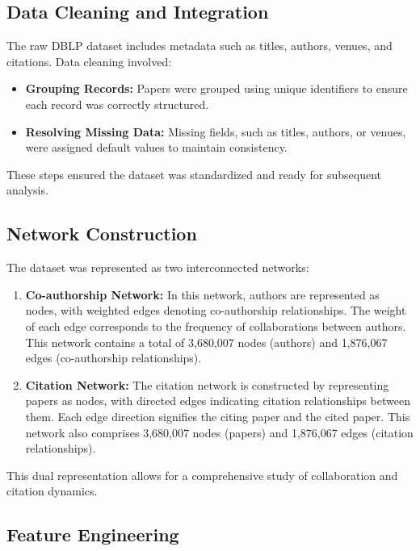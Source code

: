 \documentclass[11pt]{article}
\begin{document}
\subsection{Data Cleaning and Integration}

The raw DBLP dataset includes metadata such as titles, authors, venues, and citations. Data cleaning involved:
\begin{itemize}
	\item \textbf{Grouping Records:} Papers were grouped using unique identifiers to ensure each record was correctly structured.
	\item \textbf{Resolving Missing Data:} Missing fields, such as titles, authors, or venues, were assigned default values to maintain consistency.
\end{itemize}

These steps ensured the dataset was standardized and ready for subsequent analysis.

\subsection{Network Construction}

The dataset was represented as two interconnected networks:

\begin{enumerate}
	\item \textbf{Co-authorship Network:} In this network, authors are represented as nodes, with weighted edges denoting co-authorship relationships. The weight of each edge corresponds to the frequency of collaborations between authors. This network contains a total of 3,680,007 nodes (authors) and 1,876,067 edges (co-authorship relationships).

	\item \textbf{Citation Network:} The citation network is constructed by representing papers as nodes, with directed edges indicating citation relationships between them. Each edge direction signifies the citing paper and the cited paper. This network also comprises 3,680,007 nodes (papers) and 1,876,067 edges (citation relationships).
\end{enumerate}


This dual representation allows for a comprehensive study of collaboration and citation dynamics.

\subsection{Feature Engineering}
\end{document}
